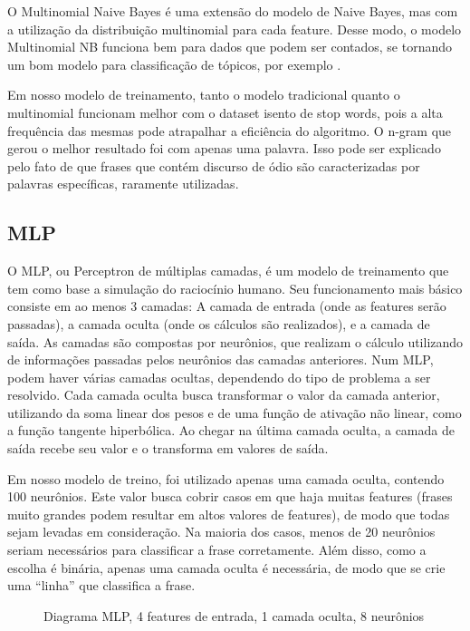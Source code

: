 O Multinomial Naive Bayes é uma extensão do modelo de Naive Bayes, mas com a utilização da distribuição multinomial para cada feature. Desse modo, o modelo Multinomial NB funciona bem para dados que podem ser contados, se tornando um bom modelo para classificação de tópicos, por exemplo \cite{russel-ia}.

Em nosso modelo de treinamento, tanto o modelo tradicional quanto o multinomial funcionam melhor com o dataset isento de stop words, pois a alta frequência das mesmas pode atrapalhar a eficiência do algoritmo. O n-gram que gerou o melhor resultado foi com apenas uma palavra. Isso pode ser explicado pelo fato de que frases que contém discurso de ódio são caracterizadas por palavras específicas, raramente utilizadas.

\subsection{MLP}

O MLP, ou Perceptron de múltiplas camadas, é um modelo de treinamento que tem como base a simulação do raciocínio humano. Seu funcionamento mais básico consiste em ao menos 3 camadas: A camada de entrada (onde as features serão passadas), a camada oculta (onde os cálculos são realizados), e a camada de saída. As camadas são compostas por neurônios, que realizam o cálculo utilizando de informações passadas pelos neurônios das camadas anteriores. Num MLP, podem haver várias camadas ocultas, dependendo do tipo de problema a ser resolvido. Cada camada oculta busca transformar o valor da camada anterior, utilizando da soma linear dos pesos e de uma função de ativação não linear, como a função tangente hiperbólica. Ao chegar na última camada oculta, a camada de saída recebe seu valor e o transforma em valores de saída.

Em nosso modelo de treino, foi utilizado apenas uma camada oculta, contendo 100 neurônios. Este valor busca cobrir casos em que haja muitas features (frases muito grandes podem resultar em altos valores de features), de modo que todas sejam levadas em consideração. Na maioria dos casos, menos de 20 neurônios seriam necessários para classificar a frase corretamente. Além disso, como a escolha é binária, apenas uma camada oculta é necessária, de modo que se crie uma “linha” que classifica a frase.

\begin{figure}[!htb]
    \caption{\label{fig:MLP} Diagrama MLP,  4 features de entrada, 1 camada oculta, 8 neurônios}
\end{figure}